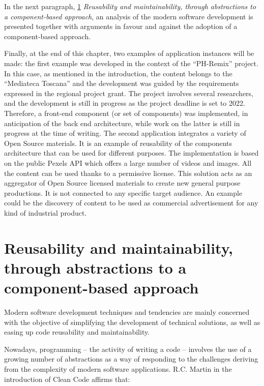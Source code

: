 In the next paragraph, \ref{sec:reuseAndMaintainability} \emph{Reusability and maintainability, through abstractions to a component-based approach}, an analysis of the modern software development is presented together with arguments in favour and against the adoption of a component-based approach.

Finally, at the end of this chapter, two examples of application instances will be made: the first example was developed in the context of the “PH-Remix” project. In this case, as mentioned in the introduction, the content belongs to the “Mediateca Toscana” and the development was guided by the requirements expressed in the regional project grant. The project involves several researchers, and the development is still in progress as the project deadline is set to 2022. Therefore, a front-end component (or set of components) was implemented, in anticipation of the back end architecture, while work on the latter is still in progress at the time of writing.
The second application integrates a variety of Open Source materials. It is an example of reusability of the components architecture that can be used for different purposes. The implementation is based on the public Pexels API which offers a large number of videos and images. All the content can be used thanks to a permissive license. This solution acts as an aggregator of Open Source licensed materials to create new general purpose productions. It is not connected to any specific target audience. An example could be the discovery of content to be used as commercial advertisement for any kind of industrial product.

\section{Reusability and maintainability, through abstractions to a component-based approach}
\label{sec:reuseAndMaintainability}

Modern software development techniques and tendencies are mainly concerned with the objective of simplifying the development of technical solutions, as well as easing up code reusability and maintainability.

Nowadays, programming – the activity of writing a code – involves the use of a growing number of abstractions as a way of responding to the challenges deriving from the complexity of modern software applications. R.C. Martin in the introduction of Clean Code affirms that:


